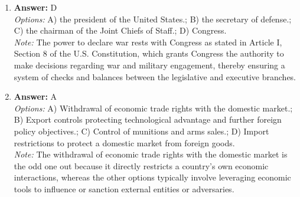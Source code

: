 \documentclass[12pt]{article}
\begin{document}
\begin{enumerate}[label=\arabic*.]
\item \textbf{Answer:} D
\\ \textit{Options:} A) the president of the United States.; B) the secretary of defense.; C) the chairman of the Joint Chiefs of Staff.; D) Congress.
\\ \textit{Note:} The power to declare war rests with Congress as stated in Article I, Section 8 of the U.S. Constitution, which grants Congress the authority to make decisions regarding war and military engagement, thereby ensuring a system of checks and balances between the legislative and executive branches.
\item \textbf{Answer:} A
\\ \textit{Options:} A) Withdrawal of economic trade rights with the domestic market.; B) Export controls protecting technological advantage and further foreign policy objectives.; C) Control of munitions and arms sales.; D) Import restrictions to protect a domestic market from foreign goods.
\\ \textit{Note:} The withdrawal of economic trade rights with the domestic market is the odd one out because it directly restricts a country's own economic interactions, whereas the other options typically involve leveraging economic tools to influence or sanction external entities or adversaries.
\end{enumerate}
\end{document}
